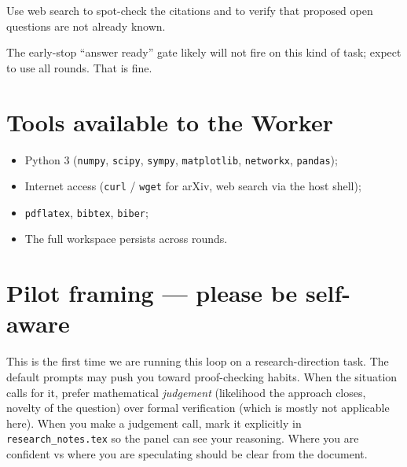 Use web search to spot-check the citations and to verify that proposed
open questions are not already known.

The early-stop ``answer ready'' gate likely will not fire on this kind
of task; expect to use all rounds. That is fine.

\section*{Tools available to the Worker}

\begin{itemize}
\item Python 3 (\texttt{numpy}, \texttt{scipy}, \texttt{sympy},
  \texttt{matplotlib}, \texttt{networkx}, \texttt{pandas});
\item Internet access (\texttt{curl} / \texttt{wget} for arXiv, web
  search via the host shell);
\item \texttt{pdflatex}, \texttt{bibtex}, \texttt{biber};
\item The full workspace persists across rounds.
\end{itemize}

\section*{Pilot framing --- please be self-aware}

This is the first time we are running this loop on a research-direction
task. The default prompts may push you toward proof-checking habits.
When the situation calls for it, prefer mathematical \emph{judgement}
(likelihood the approach closes, novelty of the question) over formal
verification (which is mostly not applicable here). When you make a
judgement call, mark it explicitly in \texttt{research\_notes.tex} so
the panel can see your reasoning. Where you are confident vs where you
are speculating should be clear from the document.
